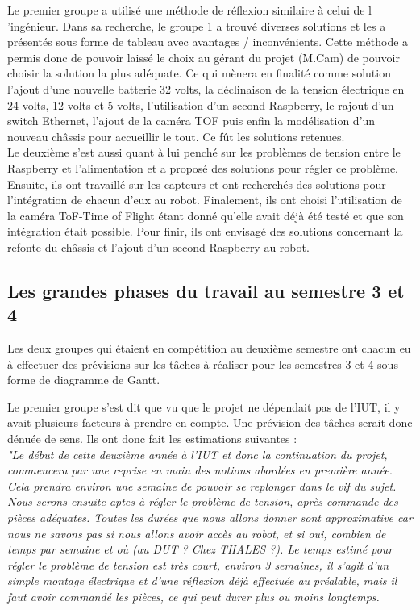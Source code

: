 \documentclass{PackagerQualityN}
\begin{document}
Le premier groupe a utilisé une méthode de réflexion similaire à celui de l ’ingénieur. Dans sa recherche, le groupe 1 a trouvé diverses solutions et les a présentés sous forme de tableau avec avantages / inconvénients. Cette méthode a permis donc de pouvoir laissé le choix au gérant du projet (M.Cam) de pouvoir choisir la solution la plus adéquate. Ce qui mènera en finalité comme solution l’ajout d’une nouvelle batterie 32 volts, la déclinaison de la tension électrique en 24 volts, 12 volts et 5 volts, l’utilisation d’un second Raspberry, le rajout d’un switch Ethernet, l'ajout de la caméra TOF puis enfin la modélisation d'un nouveau châssis pour accueillir le tout. Ce fût les solutions retenues.\\

Le deuxième s’est aussi quant à lui penché sur les problèmes de tension entre le Raspberry et l’alimentation et a proposé des solutions pour régler ce problème. Ensuite, ils ont travaillé sur les capteurs et ont recherchés des solutions pour l’intégration de chacun d’eux au robot. Finalement, ils ont choisi l’utilisation de la caméra ToF-Time of Flight étant donné qu'elle avait déjà été testé et que son intégration était possible. Pour finir, ils ont envisagé des solutions concernant la refonte du châssis et l’ajout d’un second Raspberry au robot.

\subsection*{Les grandes phases du travail au semestre 3 et 4}
Les deux groupes qui étaient en compétition au deuxième semestre ont chacun eu à effectuer des prévisions sur les tâches à réaliser pour les semestres 3 et 4 sous forme de diagramme de Gantt.


Le premier groupe s’est dit que vu que le projet ne dépendait pas de l’IUT, il y avait plusieurs facteurs à prendre en compte. Une prévision des tâches serait donc dénuée de sens. Ils ont donc fait les estimations suivantes :\\

\textit{"Le début de cette deuxième année à l’IUT et donc la continuation du projet, commencera par une reprise en main des notions abordées en première année. Cela prendra environ une semaine de pouvoir se replonger dans le vif du sujet.}\\

\textit{Nous serons ensuite aptes à régler le problème de tension, après commande des pièces adéquates. Toutes les durées que nous allons donner sont approximative car nous ne savons pas si nous allons avoir accès au robot, et si oui, combien de temps par semaine et où (au DUT ? Chez THALES ?).
Le temps estimé pour régler le problème de tension est très court, environ 3 semaines, il s’agit d’un simple montage électrique et d’une réflexion déjà effectuée au préalable, mais il faut avoir commandé les pièces, ce qui peut durer plus ou moins longtemps.}\\
\end{document}
